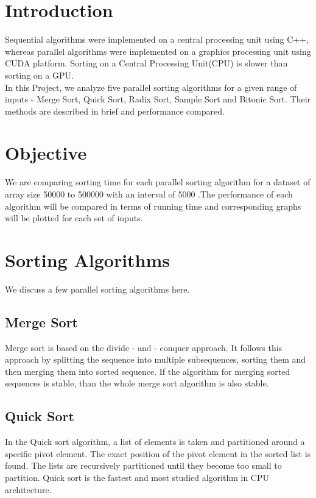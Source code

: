 \documentclass[conference]{IEEEtran}
\begin{document}
%
\IEEEpeerreviewmaketitle



\section{Introduction}
Sequential algorithms were implemented on a central processing unit using C++, whereas parallel algorithms were implemented on a graphics processing unit using CUDA platform. Sorting on a Central Processing Unit(CPU) is slower than sorting on a GPU.\\ 
In this Project, we analyze five parallel sorting algorithms for a given range of inputs - Merge Sort, Quick Sort, Radix Sort, Sample Sort and Bitonic Sort. Their methods are described in brief and performance compared.

\section{Objective}
We are comparing sorting time for each parallel sorting algorithm for a dataset of array size 50000 to 500000 with an interval of 5000 .The performance of each algorithm will be compared in terms of running time and corresponding graphs will be plotted for each set of inputs. 

\section{Sorting Algorithms}
We discuss a few parallel sorting algorithms here.
\subsection{Merge Sort}
Merge sort is based on the divide - and - conquer approach. It follows this approach by splitting the sequence into multiple subsequences, sorting them and then merging them into sorted sequence. If the algorithm for merging sorted sequences is stable, than the whole merge sort algorithm is also stable.

\subsection{Quick Sort}
In the Quick sort algorithm, a list of elements is taken and partitioned around a specific pivot element. The exact position of the pivot element in the sorted list is found. The lists are recursively partitioned until they become too small to partition. Quick sort is the fastest and most studied algorithm in CPU architecture.
\end{document}
